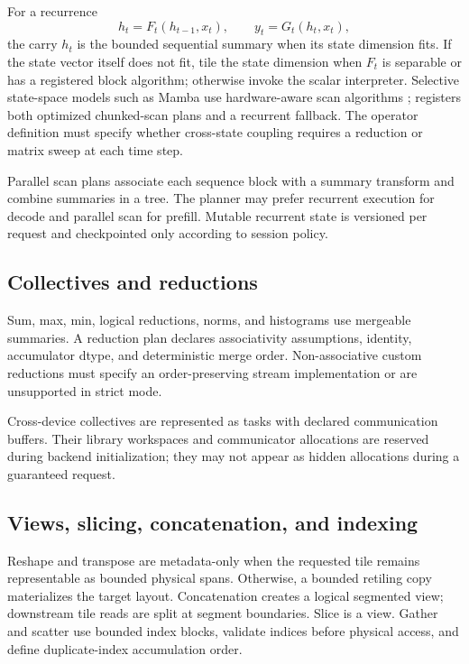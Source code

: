 For a recurrence
\[
  h_t=F_t(h_{t-1},x_t),\qquad y_t=G_t(h_t,x_t),
\]
the carry $h_t$ is the bounded sequential summary when its state dimension fits. If the state vector itself does not fit, tile the state dimension when $F_t$ is separable or has a registered block algorithm; otherwise invoke the scalar interpreter. Selective state-space models such as Mamba use hardware-aware scan algorithms \cite{gu2023mamba}; \AMS registers both optimized chunked-scan plans and a recurrent fallback. The operator definition must specify whether cross-state coupling requires a reduction or matrix sweep at each time step.

Parallel scan plans associate each sequence block with a summary transform and combine summaries in a tree. The planner may prefer recurrent execution for decode and parallel scan for prefill. Mutable recurrent state is versioned per request and checkpointed only according to session policy.

\subsection{Collectives and reductions}

Sum, max, min, logical reductions, norms, and histograms use mergeable summaries. A reduction plan declares associativity assumptions, identity, accumulator dtype, and deterministic merge order. Non-associative custom reductions must specify an order-preserving stream implementation or are unsupported in strict mode.

Cross-device collectives are represented as tasks with declared communication buffers. Their library workspaces and communicator allocations are reserved during backend initialization; they may not appear as hidden allocations during a guaranteed request.

\subsection{Views, slicing, concatenation, and indexing}

Reshape and transpose are metadata-only when the requested tile remains representable as bounded physical spans. Otherwise, a bounded retiling copy materializes the target layout. Concatenation creates a logical segmented view; downstream tile reads are split at segment boundaries. Slice is a view. Gather and scatter use bounded index blocks, validate indices before physical access, and define duplicate-index accumulation order.

